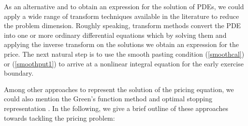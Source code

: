 \documentclass[fleqn,final,3p,11pt]{elsarticle}
\theoremstyle{definition}
\theoremstyle{remark}
\numberwithin{equation}{section}
\begin{document}
As an alternative and to obtain an expression for the solution of PDEs, we could apply a wide range of transform techniques available in the literature \cite{stamicar, shev2} to reduce the problem dimension. Roughly speaking, transform methods convert the PDE into one or more ordinary differential equations which by solving them and applying the inverse transform on the solutions we obtain an expression for the price. The next natural step is to use the smooth pasting condition (\ref{smoothcal}) or (\ref{smoothput1}) to arrive at a nonlinear integral equation for the early exercise boundary.

Among other approaches to represent the solution of the pricing equation, we could also mention the Green's function method \cite{evans} and optimal stopping representation \cite{peskir}. In the following, we give a brief outline of these approaches towards tackling the pricing problem:
\end{document}
